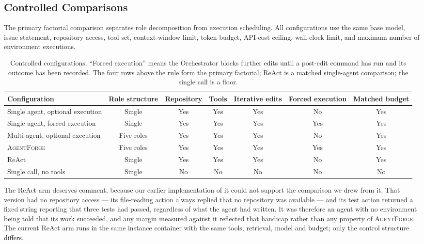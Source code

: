 \documentclass[journal]{IEEEtran}
\newcommand{\agentforge}{\textsc{AgentForge}}
\begin{document}
\subsection{Controlled Comparisons}

The primary factorial comparison separates role decomposition from execution scheduling. All configurations use the same base model, issue statement, repository access, tool set, context-window limit, token budget, API-cost ceiling, wall-clock limit, and maximum number of environment executions.

\begin{table}[t]
\centering
\caption{Controlled configurations. ``Forced execution'' means the Orchestrator blocks further edits until a post-edit command has run and its outcome has been recorded. The four rows above the rule form the primary factorial; ReAct is a matched single-agent comparison; the single call is a floor.}
\label{tab:configs}
\begin{tabular}{lcccccc}
\toprule
Configuration & Role structure & Repository & Tools & Iterative edits & Forced execution & Matched budget \\
\midrule
Single agent, optional execution & Single & Yes & Yes & Yes & No & Yes \\
Single agent, forced execution & Single & Yes & Yes & Yes & Yes & Yes \\
Multi-agent, optional execution & Five roles & Yes & Yes & Yes & No & Yes \\
\agentforge{} & Five roles & Yes & Yes & Yes & Yes & Yes \\
\midrule
ReAct & Single & Yes & Yes & Yes & No & Yes \\
Single call, no tools & Single & No & No & No & No & No \\
\bottomrule
\end{tabular}
\end{table}

The ReAct arm deserves comment, because our earlier implementation of it could not support the comparison we drew from it. That version had no repository access — its file-reading action always replied that no repository was available — and its test action returned a fixed string reporting that three tests had passed, regardless of what the agent had written. It was therefore an agent with no environment being told that its work succeeded, and any margin measured against it reflected that handicap rather than any property of \agentforge{}. The current ReAct arm runs in the same instance container with the same tools, retrieval, model and budget; only the control structure differs.
\end{document}
